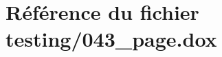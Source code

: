 \hypertarget{043__page_8dox}{}\section{Référence du fichier testing/043\+\_\+page.dox}
\label{043__page_8dox}
